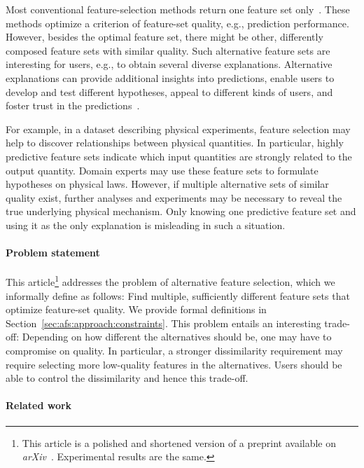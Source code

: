\documentclass[iicol, sn-basic, Numbered]{sn-jnl} %
\theoremstyle{plain}
\theoremstyle{definition}
\begin{document}
Most conventional feature-selection methods return one feature set only~\cite{borboudakis2021extending}.
These methods optimize a criterion of feature-set quality, e.g., prediction performance.
However, besides the optimal feature set, there might be other, differently composed feature sets with similar quality.
Such alternative feature sets are interesting for users, e.g., to obtain several diverse explanations.
Alternative explanations can provide additional insights into predictions, enable users to develop and test different hypotheses, appeal to different kinds of users, and foster trust in the predictions~\cite{kim2021multi, wang2019designing}.

For example, in a dataset describing physical experiments, feature selection may help to discover relationships between physical quantities.
In particular, highly predictive feature sets indicate which input quantities are strongly related to the output quantity.
Domain experts may use these feature sets to formulate hypotheses on physical laws.
However, if multiple alternative sets of similar quality exist, further analyses and experiments may be necessary to reveal the true underlying physical mechanism.
Only knowing one predictive feature set and using it as the only explanation is misleading in such a situation.

\paragraph{Problem statement}

This article\footnote{
	This article is a polished and shortened version of a preprint available on \emph{arXiv}~\cite{bach2023finding}.
	Experimental results are the same.
}
addresses the problem of alternative feature selection, which we informally define as follows:
Find multiple, sufficiently different feature sets that optimize feature-set quality.
We provide formal definitions in Section~\ref{sec:afs:approach:constraints}.
This problem entails an interesting trade-off:
Depending on how different the alternatives should be, one may have to compromise on quality.
In particular, a stronger dissimilarity requirement may require selecting more low-quality features in the alternatives.
Users should be able to control the dissimilarity and hence this trade-off.

\paragraph{Related work}
\end{document}
